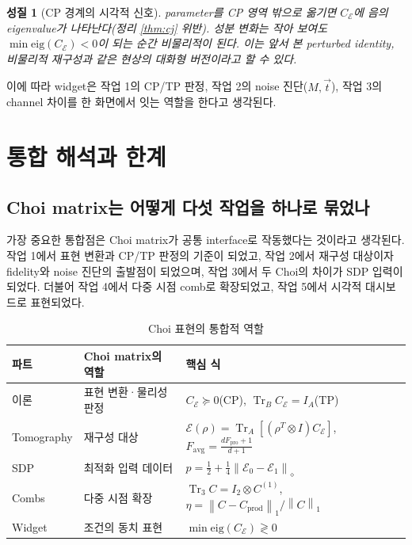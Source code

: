 \documentclass[11pt,a4paper]{article}
\newcommand{\E}{\mathcal{E}}
\newcommand{\Tr}{\operatorname{Tr}}
\newcommand{\diamondnorm}[1]{\left\lVert #1 \right\rVert_{\diamond}}
\newcommand{\onenorm}[1]{\left\lVert #1 \right\rVert_{1}}
\theoremstyle{definition}
\theoremstyle{plain}
\newtheorem{property}{성질}[section]
\theoremstyle{remark}
\begin{document}
\begin{property}[CP 경계의 시각적 신호]
parameter를 CP 영역 밖으로 옮기면 $C_\E$에 음의 eigenvalue가 나타난다(정리 \ref{thm:cj} 위반). 성분 변화는 작아 보여도 $\min\mathrm{eig}(C_\E)<0$이 되는 순간 비물리적이 된다. 이는 앞서 본 perturbed identity, 비물리적 재구성과 같은 현상의 대화형 버전이라고 할 수 있다.
\end{property}

이에 따라 widget은 작업 1의 CP/TP 판정, 작업 2의 noise 진단($M,\vec t$), 작업 3의 channel 차이를 한 화면에서 잇는 역할을 한다고 생각된다.

\section{통합 해석과 한계}

\subsection{Choi matrix는 어떻게 다섯 작업을 하나로 묶었나}

가장 중요한 통합점은 Choi matrix가 공통 interface로 작동했다는 것이라고 생각된다. 작업 1에서 표현 변환과 CP/TP 판정의 기준이 되었고, 작업 2에서 재구성 대상이자 fidelity와 noise 진단의 출발점이 되었으며, 작업 3에서 두 Choi의 차이가 SDP 입력이 되었다. 더불어 작업 4에서 다중 시점 comb로 확장되었고, 작업 5에서 시각적 대시보드로 표현되었다.

\begin{longtable}{p{}p{}p{}}
\caption{Choi 표현의 통합적 역할}
\label{tab:integration}\\
\toprule
파트 & Choi matrix의 역할 & 핵심 식 \\
\midrule
\endhead
이론 & 표현 변환·물리성 판정 & $C_\E\succeq0$(CP), $\Tr_B C_\E=I_A$(TP) \\
Tomography & 재구성 대상 & $\E(\rho)=\Tr_A[(\rho^T\otimes I)C_\E]$, $F_{\mathrm{avg}}=\frac{dF_{\mathrm{pro}}+1}{d+1}$ \\
SDP & 최적화 입력 데이터 & $p=\tfrac12+\tfrac14\diamondnorm{\E_0-\E_1}$ \\
Combs & 다중 시점 확장 & $\Tr_3 C=I_2\otimes C^{(1)}$, $\eta=\onenorm{C-C_{\mathrm{prod}}}/\onenorm{C}$ \\
Widget & 조건의 동치 표현 & $\min\mathrm{eig}(C_\E)\gtrless0$ \\
\bottomrule
\end{longtable}
\end{document}
